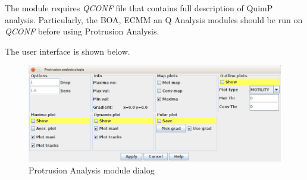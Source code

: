 \documentclass[a4paper,12pt]{article}
\begin{document}
The module requires \textit{QCONF} file that contains full description of QuimP analysis. Particularly, the BOA, ECMM an Q Analysis modules should be run on \textit{QCONF} before using Protrusion Analysis.

The user interface is shown below.

\begin{figure}[ht]
	\centering
	\includegraphics[width=16cm]{protrusion_window.png} 
	\caption{Protrusion Analysis module dialog}
	\label{fig:protrusiondialog}
\end{figure}
\end{document}
